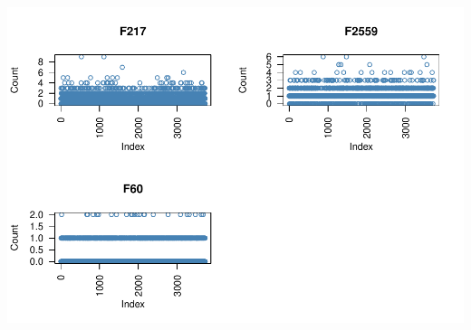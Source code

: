 \documentclass[11pt,]{article}
\begin{document}
\includegraphics{describe_FSMintentions_regional_seasonal_iDE-Camb_surveysOct2017_files/figure-latex/MCA_setup-11.pdf}
\end{document}
